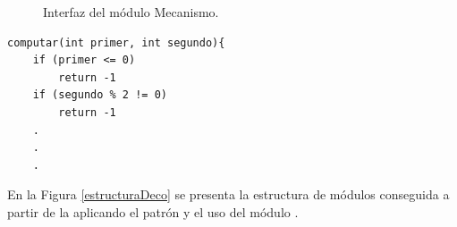 \begin{figure}[H]
\caption{Interfaz del módulo Mecanismo.}
\label{mecanismo}
\begin{center}
\end{center}
\end{figure}

\begin{lstlisting}[caption=Verificación de precondiciones en método Computar.,label=verificacion]
computar(int primer, int segundo){
	if (primer <= 0)
		return -1
	if (segundo % 2 != 0)
		return -1
	.
	.
	.
\end{lstlisting}

En la Figura \ref{estructuraDeco} se presenta la estructura de módulos conseguida a partir de la aplicando el patrón y el uso del módulo \ErrorHandler.


